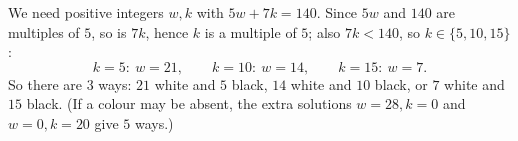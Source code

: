 We need positive integers $w,k$ with $5w+7k=140$. Since $5w$ and $140$ are multiples of $5$, so is $7k$, hence $k$ is a multiple of $5$; also $7k<140$, so $k\in\{5,10,15\}$:
\[
k=5:\ w=21,\qquad k=10:\ w=14,\qquad k=15:\ w=7 .
\]
So there are $\boxed{3}$ ways: $21$ white and $5$ black, $14$ white and $10$ black, or $7$ white and $15$ black. (If a colour may be absent, the extra solutions $w=28,k=0$ and $w=0,k=20$ give $5$ ways.)
